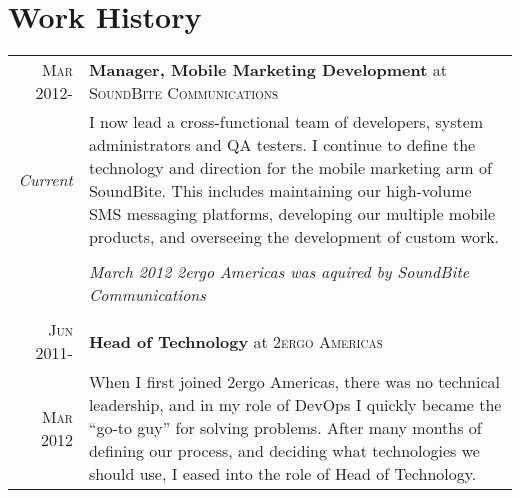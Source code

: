 \documentclass[letterpaper,10pt]{article}
\begin{document}
\section{Work History}
\begin{tabularx}{\textwidth}{r|X}

 \textsc{Mar 2012-} & \textbf{Manager, Mobile Marketing Development} at \textsc{SoundBite Communications} \\
 \emph{Current}     & I now lead a cross-functional team of developers, system administrators and QA testers. I continue to define
			the technology and direction for the mobile marketing arm of SoundBite. This includes maintaining our high-volume
			SMS messaging platforms, developing our multiple mobile products, and overseeing the development of custom work.\\

&\\
& \it{March 2012 2ergo Americas was aquired by SoundBite Communications} \\
&\\
 \textsc{Jun 2011-} & \textbf{Head of Technology} at \textsc{2ergo Americas} \\
 \textsc{Mar 2012}  & When I first joined 2ergo Americas, there was no technical leadership, and in my role of DevOps
			I quickly became the ``go-to guy'' for solving problems. After many months of defining our process, and
			deciding what technologies we should use, I eased into the role of Head of Technology.


\end{tabularx}
\end{document}
